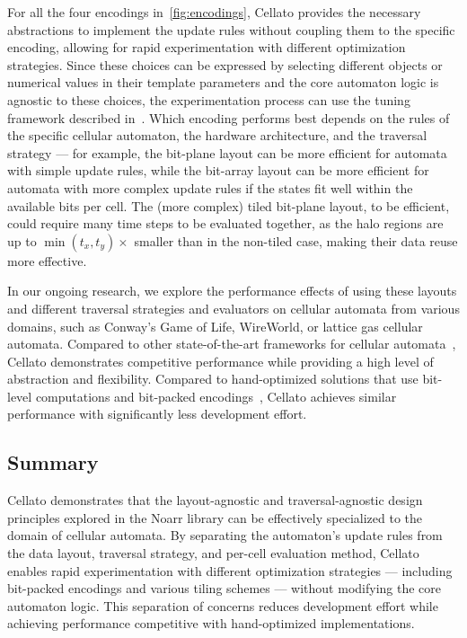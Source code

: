 For all the four encodings in~\cref{fig:encodings}, Cellato provides the necessary abstractions to implement the update rules without coupling them to the specific encoding, allowing for rapid experimentation with different optimization strategies. Since these choices can be expressed by selecting different objects or numerical values in their template parameters and the core automaton logic is agnostic to these choices, the experimentation process can use the tuning framework described in~. Which encoding performs best depends on the rules of the specific cellular automaton, the hardware architecture, and the traversal strategy --- for example, the bit-plane layout can be more efficient for automata with simple update rules, while the bit-array layout can be more efficient for automata with more complex update rules if the states fit well within the available bits per cell. The (more complex) tiled bit-plane layout, to be efficient, could require many time steps to be evaluated together, as the halo regions are up to $\min(t_x, t_y)\times$ smaller than in the non-tiled case, making their data reuse more effective.

 In our ongoing research, we explore the performance effects of using these layouts and different traversal strategies and evaluators on cellular automata from various domains, such as Conway's Game of Life, WireWorld, or lattice gas cellular automata. Compared to other state-of-the-art frameworks for cellular automata~\cite{cagigas2022efficient}, Cellato demonstrates competitive performance while providing a high level of abstraction and flexibility. Compared to hand-optimized solutions that use bit-level computations and bit-packed encodings~\cite{fujita2016fast}, Cellato achieves similar performance with significantly less development effort.


\subsection{Summary}\label{sec:cellato-summary}

Cellato demonstrates that the layout-agnostic and traversal-agnostic design principles explored in the Noarr library can be effectively specialized to the domain of cellular automata. By separating the automaton's update rules from the data layout, traversal strategy, and per-cell evaluation method, Cellato enables rapid experimentation with different optimization strategies --- including bit-packed encodings and various tiling schemes --- without modifying the core automaton logic. This separation of concerns reduces development effort while achieving performance competitive with hand-optimized implementations.
